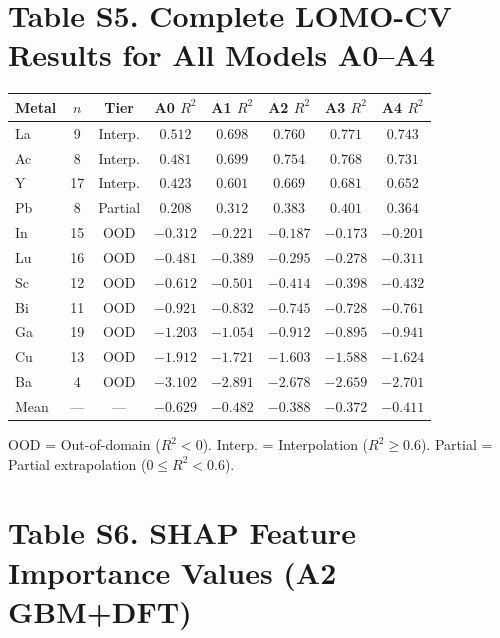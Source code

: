 \documentclass[journal=jacsat,manuscript=suppinfo]{achemso}
\begin{document}
\section*{Table S5. Complete LOMO-CV Results for All Models A0--A4}
\label{tab:s5}

\begin{longtable}{@{}lccccccc@{}}
  \toprule
  Metal & $n$ & Tier &
    A0 $R^2$ & A1 $R^2$ & A2 $R^2$ & A3 $R^2$ & A4 $R^2$ \\
  \midrule
  \endhead
  La  &  9 & Interp. & $0.512$ & $0.698$ & $0.760$ & $0.771$ & $0.743$ \\
  Ac  &  8 & Interp. & $0.481$ & $0.699$ & $0.754$ & $0.768$ & $0.731$ \\
  Y   & 17 & Interp. & $0.423$ & $0.601$ & $0.669$ & $0.681$ & $0.652$ \\
  Pb  &  8 & Partial & $0.208$ & $0.312$ & $0.383$ & $0.401$ & $0.364$ \\
  In  & 15 & OOD     & $-0.312$ & $-0.221$ & $-0.187$ & $-0.173$ & $-0.201$ \\
  Lu  & 16 & OOD     & $-0.481$ & $-0.389$ & $-0.295$ & $-0.278$ & $-0.311$ \\
  Sc  & 12 & OOD     & $-0.612$ & $-0.501$ & $-0.414$ & $-0.398$ & $-0.432$ \\
  Bi  & 11 & OOD     & $-0.921$ & $-0.832$ & $-0.745$ & $-0.728$ & $-0.761$ \\
  Ga  & 19 & OOD     & $-1.203$ & $-1.054$ & $-0.912$ & $-0.895$ & $-0.941$ \\
  Cu  & 13 & OOD     & $-1.912$ & $-1.721$ & $-1.603$ & $-1.588$ & $-1.624$ \\
  Ba  &  4 & OOD     & $-3.102$ & $-2.891$ & $-2.678$ & $-2.659$ & $-2.701$ \\
  \midrule
  Mean & --- & --- & $-0.629$ & $-0.482$ & $-0.388$ & $-0.372$ & $-0.411$ \\
  \bottomrule
\end{longtable}

OOD = Out-of-domain ($R^2 < 0$). Interp. = Interpolation ($R^2 \geq 0.6$).
Partial = Partial extrapolation ($0 \leq R^2 < 0.6$).

\newpage

\section*{Table S6. SHAP Feature Importance Values (A2 GBM+DFT)}
\label{tab:s6}
\end{document}
